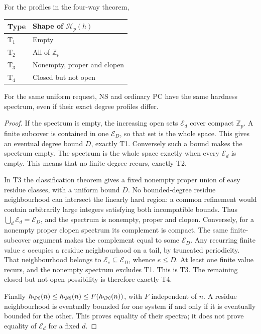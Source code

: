 \begin{proposition}\label{tx:prop:topological-spectrum}
For the profiles in the four-way theorem,
\begin{center}
\begin{tabular}{@{}ll@{}}
\toprule
Type & Shape of $\mathcal H_p(h)$\\
\midrule
$\mathrm T_1$ & Empty\\
$\mathrm T_2$ & All of $\mathbb Z_p$\\
$\mathrm T_3$ & Nonempty, proper and clopen\\
$\mathrm T_4$ & Closed but not open\\
\bottomrule
\end{tabular}
\end{center}
For the same uniform request, NS and ordinary PC have the same
hardness spectrum, even if their exact degree profiles differ.
\end{proposition}
\begin{proof}
If the spectrum is empty, the increasing open sets $\mathcal E_d$
cover compact $\mathbb Z_p$. A finite subcover is contained in one
$\mathcal E_D$, so that set is the whole space. This gives an eventual
degree bound $D$, exactly T1. Conversely such a bound makes the
spectrum empty. The spectrum is the whole space exactly when every
$\mathcal E_d$ is empty. This means that no finite degree recurs,
exactly T2.

In T3 the classification theorem gives a fixed nonempty proper union
of easy residue classes, with a uniform bound $D$. No bounded-degree
residue neighbourhood can intersect the linearly hard region: a common
refinement would contain arbitrarily large integers satisfying both
incompatible bounds. Thus $\bigcup_d\mathcal E_d=\mathcal E_D$,
and the spectrum is nonempty, proper and clopen.
Conversely, for a nonempty proper clopen spectrum its complement is
compact. The same finite-subcover argument makes the complement equal
to some $\mathcal E_D$. Any recurring finite value $e$ occupies a
residue neighbourhood on a tail, by truncated periodicity. That
neighbourhood belongs to $\mathcal E_e\subseteq\mathcal E_D$, whence
$e\le D$. At least one finite value recurs, and the nonempty spectrum
excludes T1. This is T3. The remaining closed-but-not-open possibility
is therefore exactly T4.

Finally $h_{\PC}(n)\le h_{\NS}(n)\le F(h_{\PC}(n))$, with $F$
independent of $n$. A residue neighbourhood is eventually bounded for
one system if and only if it is eventually bounded for the other.
This proves equality of their spectra; it does not prove equality of
$\mathcal E_d$ for a fixed $d$.
\end{proof}

